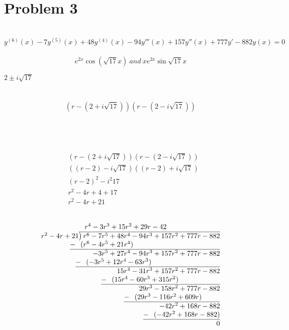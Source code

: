 \documentclass{article}
\begin{document}
    \newpage
    \section{Problem 3}
     \\
    $$y^{(6)}(x) -7y^{(5)}(x) + 48y^{(4)}(x) - 94y'''(x) + 157y''(x) + 777y' - 882y(x) = 0$$
     \\
    $$e^{2x}\cos(\sqrt{17}x)\ and\ xe^{2x}\sin{\sqrt{17}x}$$

    $2\pm i\sqrt{17}$
     \\ \\
     \\
    $$(r - (2 + i\sqrt{17}))(r - (2 - i\sqrt{17}))$$
     \\ \\ \\
     \\
    \begin{align*}
        &(r - (2 + i\sqrt{17}))(r - (2 - i\sqrt{17})) \\
        &((r - 2) - i\sqrt{17})((r - 2)+ i\sqrt{17}) \\
        &(r - 2)^{2} -i^{2}17\\
        &r^{2} - 4r + 4 + 17\\
        &r^{2} - 4r + 21\\
    \end{align*}
     \\
    \begin{align*}
        \begin{array}{r}
            r^{4} -3r^{3} + 15r^{2} + 29r - 42\phantom{)ddcddddddddddd} \\
            r^{2} - 4r + 21{\overline{\smash{\big)}\, r^{6}-7r^{5}+48r^{4}-94r^{3}+157r^{2}+777r-882}} \\
            \underline{-~\phantom{(}(r^{6} -4r^{5}+21r^{4})\phantom{-bbbbbbbbbbbbbbbbbbbbbbbbbb)}} \\
            -3r^{5} + 27r^{4} - 94r^{3} + 157r^{2} + 777r - 882 \phantom{}\\
            \underline{-~\phantom{(}(-3r^{5} + 12r^{4} - 63r^{3})\phantom{-bbbbbbbbbbbbbbbbbbbb)}} \\
            15r^{4} - 31r^{3} + 157r^{2} + 777r - 882 \phantom{}\\
            \underline{-~\phantom{(}(15r^{4} - 60r^{3} + 315r^{2})\phantom{-bbbbbbbbbbb)}} \\
            29r^{3} - 158r^{2} + 777r - 882 \phantom{}\\
            \underline{-~\phantom{(}(29r^{3} - 116r^{2} + 609r)\phantom{-bdbb}} \\
            -42r^{2} + 168r - 882 \phantom{}\\
            \underline{-~\phantom{(}(-42r^{2} + 168r - 882)\phantom{}} \\
            0 \phantom{}\\
        \end{array}
    \end{align*}
\end{document}
